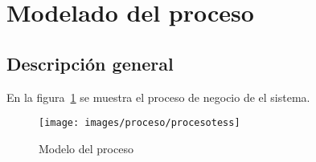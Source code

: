\section{Modelado del proceso}
\label{sec:procesoDeNegocio}


\subsection{Descripción general}

	En la figura~\ref{fig:modeloProceso} se muestra el proceso de negocio de el sistema.
	
\begin{figure}[htbp!]
	\begin{center}
		\texttt{[image: images/proceso/procesotess]}
		\caption{Modelo del proceso}
		\label{fig:modeloProceso}
	\end{center}
\end{figure}

\newpage